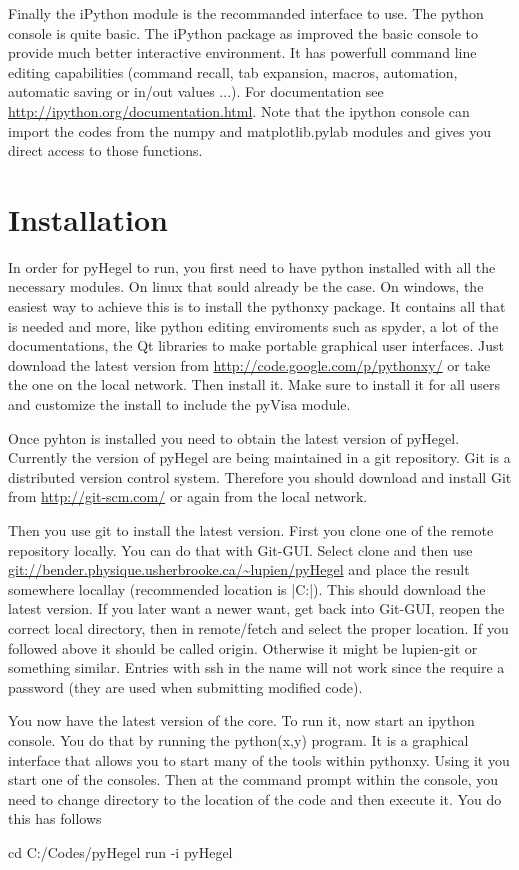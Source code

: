 \documentclass[letterpaper,12pt]{article}
\begin{document}
Finally the iPython module is the recommanded interface to use. The python 
console is quite basic. The iPython package as improved the basic console to
provide much better interactive environment. It has powerfull command line
editing capabilities (command recall, tab expansion, macros, automation,
automatic saving or in/out values ...).
For documentation see \url{http://ipython.org/documentation.html}.
Note that the ipython console can import the codes from the numpy and matplotlib.pylab
modules and gives you direct access to those functions.



\section{Installation}
In order for pyHegel to run, you first need to have python installed
with all the necessary modules. On linux that sould already be the case. On
windows, the easiest way to achieve this is to install the pythonxy
package. It contains all that is needed and more, like python editing enviroments
such as spyder, a lot of the documentations, the Qt libraries to make portable
graphical user interfaces. Just download the latest version from 
\url{http://code.google.com/p/pythonxy/} or take the one on 
the local network. Then install it. Make sure to install it for all users
and customize the install to include the pyVisa module.

Once pyhton is installed you need to obtain the latest version of pyHegel.
Currently the version of pyHegel are being maintained in a git repository.
Git is a distributed version control system. Therefore you should download
and install Git from \url{http://git-scm.com/} or again from the local network.

Then you use git to install the latest version. First you clone one of the
remote repository locally. You can do that with Git-GUI. Select clone and then
use \url{git://bender.physique.usherbrooke.ca/~lupien/pyHegel} and place the 
result somewhere locallay (recommended location is
 |C:\Codes\pyHegel|). This should download the latest version. If you later
want a newer want, get back into Git-GUI, reopen the correct local directory,
then in remote/fetch and select the proper location.
If you followed above it should be called origin. Otherwise it might be
lupien-git or something similar. Entries with ssh in the name will not work
since the require a password (they are used when submitting modified code).

You now have the latest version of the core. To run it, now start an ipython console.
You do that by running the python(x,y) program. It is a graphical interface that
allows you to start many of the tools within pythonxy. Using it you start one
of the consoles. Then at the command prompt within the console, you 
need to change directory to the location of the code and then execute it.
You do this has follows
\begin{code}
cd C:/Codes/pyHegel
run -i pyHegel
\end{code}
\end{document}
